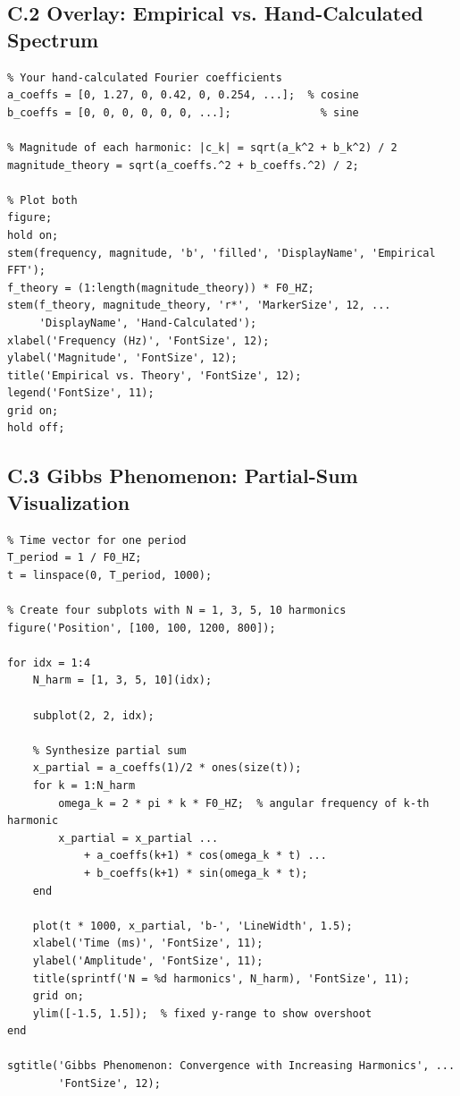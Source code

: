 \documentclass[11pt,letterpaper]{article}
\begin{document}
\subsection*{C.2 Overlay: Empirical vs. Hand-Calculated Spectrum}

\begin{verbatim}
% Your hand-calculated Fourier coefficients
a_coeffs = [0, 1.27, 0, 0.42, 0, 0.254, ...];  % cosine
b_coeffs = [0, 0, 0, 0, 0, 0, ...];              % sine

% Magnitude of each harmonic: |c_k| = sqrt(a_k^2 + b_k^2) / 2
magnitude_theory = sqrt(a_coeffs.^2 + b_coeffs.^2) / 2;

% Plot both
figure;
hold on;
stem(frequency, magnitude, 'b', 'filled', 'DisplayName', 'Empirical FFT');
f_theory = (1:length(magnitude_theory)) * F0_HZ;
stem(f_theory, magnitude_theory, 'r*', 'MarkerSize', 12, ...
     'DisplayName', 'Hand-Calculated');
xlabel('Frequency (Hz)', 'FontSize', 12);
ylabel('Magnitude', 'FontSize', 12);
title('Empirical vs. Theory', 'FontSize', 12);
legend('FontSize', 11);
grid on;
hold off;
\end{verbatim}

\subsection*{C.3 Gibbs Phenomenon: Partial-Sum Visualization}

\begin{verbatim}
% Time vector for one period
T_period = 1 / F0_HZ;
t = linspace(0, T_period, 1000);

% Create four subplots with N = 1, 3, 5, 10 harmonics
figure('Position', [100, 100, 1200, 800]);

for idx = 1:4
    N_harm = [1, 3, 5, 10](idx);

    subplot(2, 2, idx);

    % Synthesize partial sum
    x_partial = a_coeffs(1)/2 * ones(size(t));
    for k = 1:N_harm
        omega_k = 2 * pi * k * F0_HZ;  % angular frequency of k-th harmonic
        x_partial = x_partial ...
            + a_coeffs(k+1) * cos(omega_k * t) ...
            + b_coeffs(k+1) * sin(omega_k * t);
    end

    plot(t * 1000, x_partial, 'b-', 'LineWidth', 1.5);
    xlabel('Time (ms)', 'FontSize', 11);
    ylabel('Amplitude', 'FontSize', 11);
    title(sprintf('N = %d harmonics', N_harm), 'FontSize', 11);
    grid on;
    ylim([-1.5, 1.5]);  % fixed y-range to show overshoot
end

sgtitle('Gibbs Phenomenon: Convergence with Increasing Harmonics', ...
        'FontSize', 12);
\end{verbatim}
\end{document}
